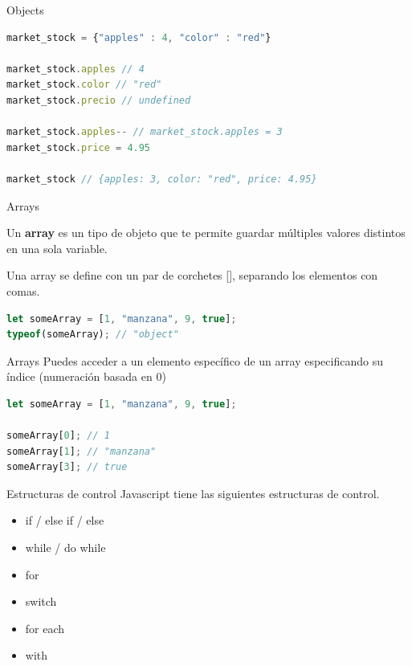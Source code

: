 \documentclass{beamer}
\begin{document}
\begin{frame}[fragile]{Objects}
\begin{lstlisting}[language=JavaScript]
market_stock = {"apples" : 4, "color" : "red"}

market_stock.apples // 4
market_stock.color // "red"
market_stock.precio // undefined

market_stock.apples-- // market_stock.apples = 3
market_stock.price = 4.95

market_stock // {apples: 3, color: "red", price: 4.95}
\end{lstlisting}
\end{frame}

\begin{frame}[fragile]{Arrays}

Un \textbf{array} es un tipo de objeto que te permite guardar múltiples valores distintos en una sola variable.

Una array se define con un par de corchetes [], separando los elementos con comas.

\begin{lstlisting}[language=JavaScript]
let someArray = [1, "manzana", 9, true];
typeof(someArray); // "object"
\end{lstlisting}


\end{frame}

\begin{frame}[fragile]{Arrays}
Puedes acceder a un elemento específico de un array especificando su índice (numeración basada en 0)

\begin{lstlisting}[language=JavaScript]
let someArray = [1, "manzana", 9, true];

someArray[0]; // 1
someArray[1]; // "manzana"
someArray[3]; // true
\end{lstlisting} 
\end{frame}


\begin{frame}{Estructuras de control}
Javascript tiene las siguientes estructuras de control.
\begin{itemize}
    \item if / else if / else
    \item while / do while
    \item for
    \item switch
    \item for each
    \item with
\end{itemize}
\end{frame}
\end{document}
